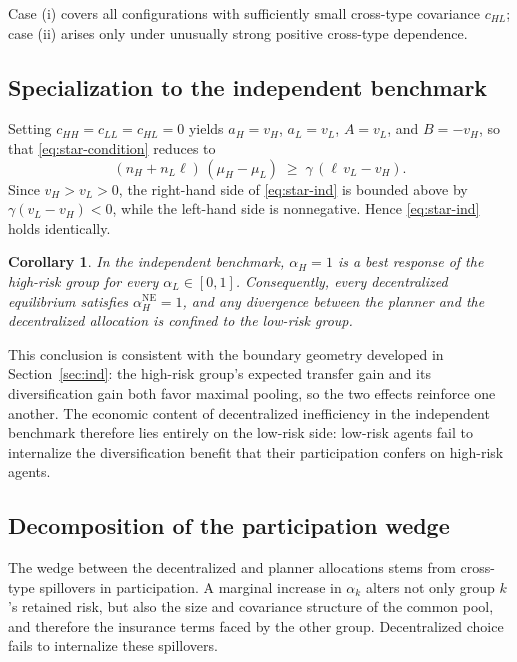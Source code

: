 \documentclass[a4paper,12pt]{article}
\newtheorem{corollary}[theorem]{Corollary}
\theoremstyle{definition}
\theoremstyle{remark}
\newcommand{\1}{\mathbf{1}}
\begin{document}
Case (i) covers all configurations with sufficiently small cross-type
covariance \(c_{HL}\); case (ii) arises only under unusually strong positive
cross-type dependence.

\subsection{Specialization to the independent benchmark}

Setting \(c_{HH}=c_{LL}=c_{HL}=0\) yields \(a_H=v_H\), \(a_L=v_L\),
\(A=v_L\), and \(B=-v_H\), so that \eqref{eq:star-condition} reduces to
\begin{equation}
(n_H+n_L\ell)\,(\mu_H-\mu_L)\;\ge\;\gamma\,(\ell\,v_L-v_H).
\label{eq:star-ind}
\end{equation}
Since \(v_H>v_L>0\), the right-hand side of \eqref{eq:star-ind} is bounded
above by \(\gamma(v_L-v_H)<0\), while the left-hand side is nonnegative.
Hence \eqref{eq:star-ind} holds identically.

\begin{corollary}\label{cor:ind-alphaH1}
In the independent benchmark, \(\alpha_H=1\) is a best response of the
high-risk group for every \(\alpha_L\in[0,1]\). Consequently, every
decentralized equilibrium satisfies \(\alpha_H^{\mathrm{NE}}=1\), and any
divergence between the planner and the decentralized allocation is confined to
the low-risk group.
\end{corollary}

This conclusion is consistent with the boundary geometry developed in
Section~\ref{sec:ind}: the high-risk group's expected transfer gain and its
diversification gain both favor maximal pooling, so the two effects reinforce
one another. The economic content of decentralized inefficiency in the
independent benchmark therefore lies entirely on the low-risk side: low-risk
agents fail to internalize the diversification benefit that their
participation confers on high-risk agents.

\subsection{Decomposition of the participation wedge}

The wedge between the decentralized and planner allocations stems from
cross-type spillovers in participation. A marginal increase in \(\alpha_k\)
alters not only group \(k\)'s retained risk, but also the size and covariance
structure of the common pool, and therefore the insurance terms faced by the
other group. Decentralized choice fails to internalize these spillovers.
\end{document}
